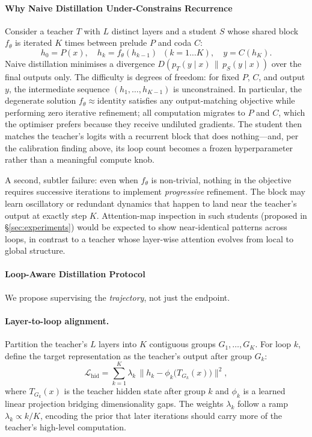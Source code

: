 \paragraph{Why Naive Distillation Under-Constrains Recurrence}

Consider a teacher $T$ with $L$ distinct layers and a student $S$ whose
shared block $f_\theta$ is iterated $K$ times between prelude $P$ and
coda $C$:
\begin{equation}
h_0 = P(x), \quad h_{k} = f_\theta(h_{k-1})\;\; (k=1\ldots K), \quad
y = C(h_K).
\end{equation}
Naive distillation minimises a divergence $D(p_T(y\mid x)\,\|\,p_S(y\mid
x))$ over the final outputs only. The difficulty is degrees of
freedom: for fixed $P$, $C$, and output $y$, the intermediate sequence
$(h_1, \ldots, h_{K-1})$ is unconstrained. In particular, the
degenerate solution $f_\theta \approx \mathrm{identity}$ satisfies any
output-matching objective while performing zero iterative refinement;
all computation migrates to $P$ and $C$, which the optimiser prefers
because they receive undiluted gradients. The student then matches the
teacher's logits with a recurrent block that does nothing---and, per
the calibration finding above, its loop count becomes a frozen
hyperparameter rather than a meaningful compute knob.

A second, subtler failure: even when $f_\theta$ is non-trivial, nothing
in the objective requires successive iterations to implement
\emph{progressive} refinement. The block may learn oscillatory or
redundant dynamics that happen to land near the teacher's output at
exactly step $K$. Attention-map inspection in such students (proposed
in \S\ref{sec:experiments}) would be expected to show near-identical
patterns across loops, in contrast to a teacher whose layer-wise
attention evolves from local to global structure.

\paragraph{Loop-Aware Distillation Protocol}

We propose supervising the \emph{trajectory}, not just the endpoint.

\paragraph{Layer-to-loop alignment.} Partition the teacher's $L$
layers into $K$ contiguous groups $G_1, \ldots, G_K$. For loop $k$,
define the target representation as the teacher's output after group
$G_k$:
\begin{equation}
\mathcal{L}_{\mathrm{hid}} = \sum_{k=1}^{K} \lambda_k \,
\big\lVert h_k - \phi_k\big(T_{G_k}(x)\big) \big\rVert^2,
\end{equation}
where $T_{G_k}(x)$ is the teacher hidden state after group $k$ and
$\phi_k$ is a learned linear projection bridging dimensionality gaps.
The weights $\lambda_k$ follow a ramp $\lambda_k \propto k/K$,
encoding the prior that later iterations should carry more of the
teacher's high-level computation.

